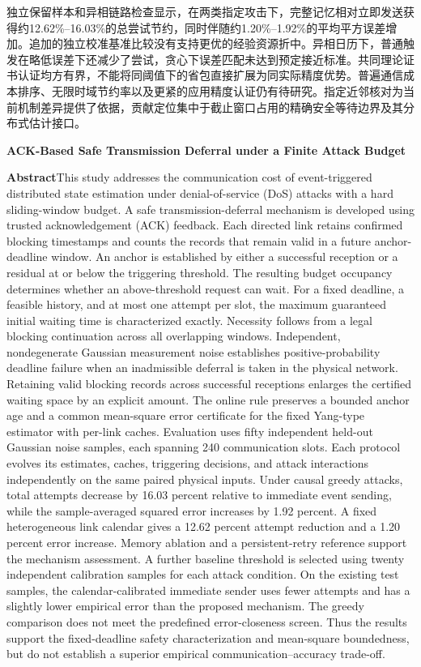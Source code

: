 \documentclass[UTF8,a4paper,zihao=5,fontset=windows]{ctexart}
\begin{document}
独立保留样本和异相链路检查显示，在两类指定攻击下，完整记忆相对立即发送获得约12.62\%--16.03\%的总尝试节约，同时伴随约1.20\%--1.92\%的平均平方误差增加。追加的独立校准基准比较没有支持更优的经验资源折中。异相日历下，普通触发在略低误差下还减少了尝试，贪心下误差匹配未达到预定接近标准。共同理论证书认证均方有界，不能将同阈值下的省包直接扩展为同实际精度优势。普遍通信成本排序、无限时域节约率以及更紧的应用精度认证仍有待研究。指定近邻核对为当前机制差异提供了依据，贡献定位集中于截止窗口占用的精确安全等待边界及其分布式估计接口。

\begin{center}
\textbf{ACK-Based Safe Transmission Deferral under a Finite Attack Budget}
\end{center}
\noindent\textbf{Abstract}\quad This study addresses the communication cost of event-triggered distributed state estimation under denial-of-service (DoS) attacks with a hard sliding-window budget. A safe transmission-deferral mechanism is developed using trusted acknowledgement (ACK) feedback. Each directed link retains confirmed blocking timestamps and counts the records that remain valid in a future anchor-deadline window. An anchor is established by either a successful reception or a residual at or below the triggering threshold. The resulting budget occupancy determines whether an above-threshold request can wait. For a fixed deadline, a feasible history, and at most one attempt per slot, the maximum guaranteed initial waiting time is characterized exactly. Necessity follows from a legal blocking continuation across all overlapping windows. Independent, nondegenerate Gaussian measurement noise establishes positive-probability deadline failure when an inadmissible deferral is taken in the physical network. Retaining valid blocking records across successful receptions enlarges the certified waiting space by an explicit amount. The online rule preserves a bounded anchor age and a common mean-square error certificate for the fixed Yang-type estimator with per-link caches. Evaluation uses fifty independent held-out Gaussian noise samples, each spanning 240 communication slots. Each protocol evolves its estimates, caches, triggering decisions, and attack interactions independently on the same paired physical inputs. Under causal greedy attacks, total attempts decrease by 16.03 percent relative to immediate event sending, while the sample-averaged squared error increases by 1.92 percent. A fixed heterogeneous link calendar gives a 12.62 percent attempt reduction and a 1.20 percent error increase. Memory ablation and a persistent-retry reference support the mechanism assessment. A further baseline threshold is selected using twenty independent calibration samples for each attack condition. On the existing test samples, the calendar-calibrated immediate sender uses fewer attempts and has a slightly lower empirical error than the proposed mechanism. The greedy comparison does not meet the predefined error-closeness screen. Thus the results support the fixed-deadline safety characterization and mean-square boundedness, but do not establish a superior empirical communication--accuracy trade-off.
\end{document}
